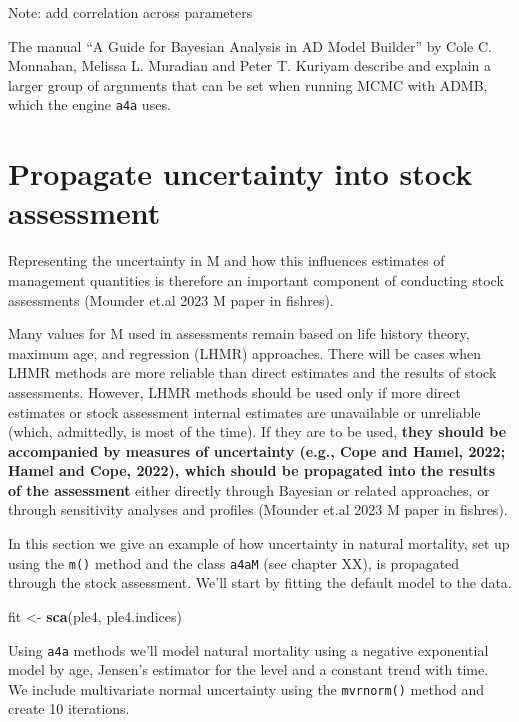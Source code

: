 \documentclass[
]{book}
\newenvironment{Shaded}{\begin{snugshade}}{\end{snugshade}}
\newcommand{\FunctionTok}[1]{\textcolor[rgb]{0.13,0.29,0.53}{\textbf{#1}}}
\newcommand{\NormalTok}[1]{#1}
\newcommand{\OtherTok}[1]{\textcolor[rgb]{0.56,0.35,0.01}{#1}}
\begin{document}
Note: add correlation across parameters

The manual ``A Guide for Bayesian Analysis in AD Model Builder'' by Cole C. Monnahan, Melissa L. Muradian and Peter T. Kuriyam describe and explain a larger group of arguments that can be set when running MCMC with ADMB, which the engine \texttt{a4a} uses.

\hypertarget{propagate-uncertainty-into-stock-assessment}{%
\chapter{Propagate uncertainty into stock assessment}\label{propagate-uncertainty-into-stock-assessment}}

Representing the uncertainty in M and how this influences estimates of management quantities is therefore an important component of conducting stock assessments (Mounder et.al 2023 M paper in fishres).

Many values for M used in assessments remain based on life history theory, maximum age, and regression (LHMR) approaches. There will be cases when LHMR methods are more reliable than direct estimates and the results of stock assessments. However, LHMR methods should be used only if more direct estimates or stock assessment internal estimates are unavailable or unreliable (which, admittedly, is most of the time). If they are to be used, \textbf{they should be accompanied by measures of uncertainty (e.g., Cope and Hamel, 2022; Hamel and Cope, 2022), which should be propagated into the results of the assessment} either directly through Bayesian or related approaches, or through sensitivity analyses and profiles (Mounder et.al 2023 M paper in fishres).

In this section we give an example of how uncertainty in natural mortality, set up using the \texttt{m()} method and the class \texttt{a4aM} (see chapter XX), is propagated through the stock assessment. We'll start by fitting the default model to the data.

\begin{Shaded}
\begin{Highlighting}[]
\NormalTok{fit }\OtherTok{\textless{}{-}} \FunctionTok{sca}\NormalTok{(ple4, ple4.indices)}
\end{Highlighting}
\end{Shaded}

Using \texttt{a4a} methods we'll model natural mortality using a negative exponential model by age, Jensen's estimator for the level and a constant trend with time. We include multivariate normal uncertainty using the \texttt{mvrnorm()} method and create 10 iterations.
\end{document}
